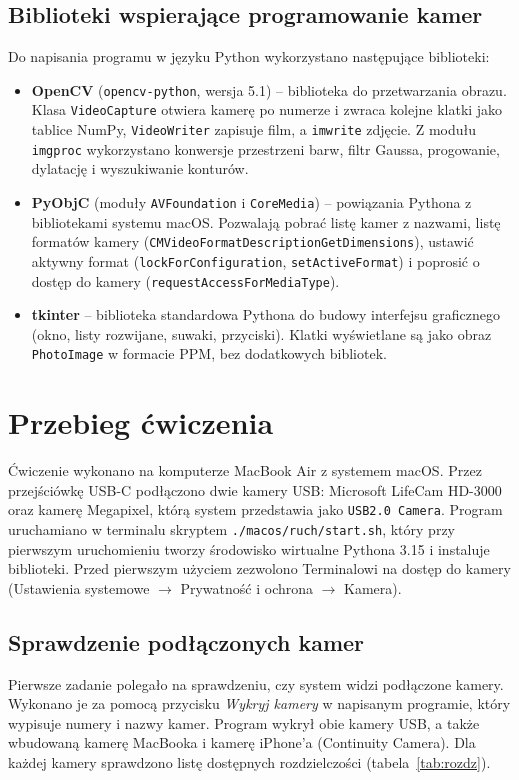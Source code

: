 \subsection{Biblioteki wspierające programowanie kamer}
Do napisania programu w języku Python wykorzystano następujące biblioteki:
\begin{itemize}
  \item \textbf{OpenCV} (\texttt{opencv-python}, wersja 5.1) -- biblioteka do przetwarzania obrazu.
    Klasa \texttt{VideoCapture} otwiera kamerę po numerze i zwraca kolejne klatki jako tablice
    NumPy, \texttt{VideoWriter} zapisuje film, a \texttt{imwrite} zdjęcie. Z modułu
    \texttt{imgproc} wykorzystano konwersje przestrzeni barw, filtr Gaussa, progowanie, dylatację
    i wyszukiwanie konturów.
  \item \textbf{PyObjC} (moduły \texttt{AVFoundation} i \texttt{CoreMedia}) -- powiązania Pythona
    z bibliotekami systemu macOS. Pozwalają pobrać listę kamer z nazwami, listę formatów kamery
    (\texttt{CMVideoFormatDescriptionGetDimensions}), ustawić aktywny format
    (\texttt{lockForConfiguration}, \texttt{setActiveFormat}) i poprosić o dostęp do kamery
    (\texttt{requestAccessForMediaType}).
  \item \textbf{tkinter} -- biblioteka standardowa Pythona do budowy interfejsu graficznego (okno,
    listy rozwijane, suwaki, przyciski). Klatki wyświetlane są jako obraz \texttt{PhotoImage}
    w formacie PPM, bez dodatkowych bibliotek.
\end{itemize}

\section{Przebieg ćwiczenia}
Ćwiczenie wykonano na komputerze MacBook Air z systemem macOS. Przez przejściówkę USB-C podłączono
dwie kamery USB: Microsoft LifeCam HD-3000 oraz kamerę Megapixel, którą system przedstawia jako
\texttt{USB2.0 Camera}. Program uruchamiano w terminalu skryptem \texttt{./macos/ruch/start.sh},
który przy pierwszym uruchomieniu tworzy środowisko wirtualne Pythona 3.15 i instaluje biblioteki.
Przed pierwszym użyciem zezwolono Terminalowi na dostęp do kamery (Ustawienia systemowe
$\rightarrow$ Prywatność i ochrona $\rightarrow$ Kamera).

\subsection{Sprawdzenie podłączonych kamer}
Pierwsze zadanie polegało na sprawdzeniu, czy system widzi podłączone kamery. Wykonano je za pomocą
przycisku \emph{Wykryj kamery} w napisanym programie, który wypisuje numery i nazwy kamer. Program
wykrył obie kamery USB, a także wbudowaną kamerę MacBooka i kamerę iPhone'a (Continuity Camera).
Dla każdej kamery sprawdzono listę dostępnych rozdzielczości (tabela~\ref{tab:rozdz}).

